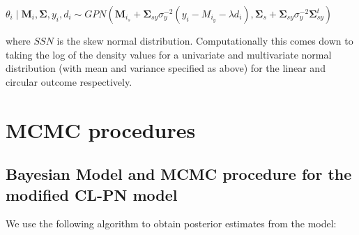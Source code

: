 \documentclass[12pt,]{article}
\begin{document}
\begin{itemize}
$\theta_i \mid \boldsymbol{M}_i, \boldsymbol{\Sigma}, y_i, d_i \sim GPN(\boldsymbol{M}_{i_s} + \boldsymbol{\Sigma}_{sy}\sigma^{-2}_y(y_i - M_{i_y} - \lambda d_i), \boldsymbol{\Sigma}_s + \boldsymbol{\Sigma}_{sy}\sigma_y^{-2}\boldsymbol{\Sigma}_{sy}^t)$

where $SSN$ is the skew normal distribution. Computationally this comes down to taking the log of the density values for a univariate and multivariate normal distribution (with mean and variance specified as above) for the linear and circular outcome respectively.

\end{itemize}

\section{MCMC procedures}
\subsection{Bayesian Model and MCMC procedure for the modified CL-PN model}\label{A1}

We use the following algorithm to obtain posterior estimates from the
model:
\end{document}
